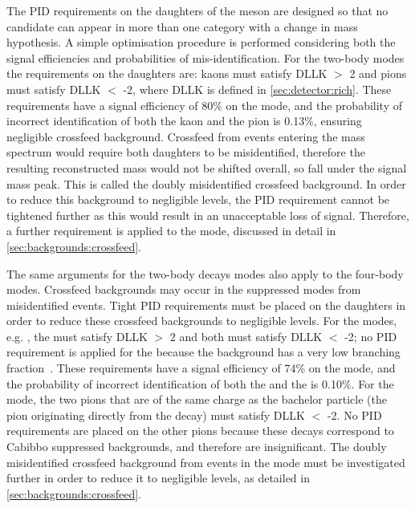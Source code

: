 The PID requirements on the daughters of the \Dz meson are designed so that no  candidate can appear in more than one category with a change in mass hypothesis. A simple optimisation procedure is performed considering both the signal efficiencies and probabilities of mis-identification. For the two-body \Dz modes the requirements on the \Dz daughters are: kaons must satisfy DLLK $>$ 2 and pions must satisfy DLLK $<$ -2, where DLLK is defined in \sect\ref{sec:detector:rich}. These requirements have a signal efficiency of 80\% on the \kpi mode, and the probability of incorrect identification of both the kaon and the pion is 0.13\%, ensuring negligible crossfeed background. Crossfeed from \kpi events entering the \pik mass spectrum would require both \Dz daughters to be misidentified, therefore the resulting reconstructed \Dz mass would not be shifted overall, so fall under the signal \Dz mass peak. This is called the doubly misidentified crossfeed background. In order to reduce this background to negligible levels, the PID requirement cannot be tightened further as this would result in an unacceptable loss of signal. Therefore, a further requirement is applied to the \pik mode, discussed in detail in \sect\ref{sec:backgrounds:crossfeed}.

The same arguments for the two-body \Dz decays modes also apply to the four-body modes. Crossfeed backgrounds may occur in the suppressed \Dz modes from misidentified \kpipipi events. Tight PID requirements must be placed on the \Dz daughters in order to reduce these crossfeed backgrounds to negligible levels. For the \decay{\Dz}{\Kmp\pipm\pimp\pipm} modes, e.g. \decay{\Dz}{\Km\pip\pim\pip}, the \Km must satisfy DLLK $>$ 2 and both \pip must satisfy DLLK $<$ -2; no PID requirement is applied for the \pim because the background \decay{\Dz}{\Kp\Km\Kp\pim} has a very low branching fraction~\cite{PDG2016}. These requirements have a signal efficiency of 74\% on the \kpipipi mode, and the probability of incorrect identification of both the \Km and the \pip is 0.10\%. For the \decay{\Dz}{\pip\pim\pip\pim} mode, the two pions that are of the same charge as the bachelor particle (the pion originating directly from the \Kstarm decay) must satisfy DLLK $<$ -2. No PID requirements are placed on the other pions because these decays correspond to Cabibbo suppressed backgrounds, and therefore are insignificant. The doubly misidentified crossfeed background from \kpipipi events in the \pikpipi mode must be investigated further in order to reduce it to negligible levels, as detailed in \sect\ref{sec:backgrounds:crossfeed}.


